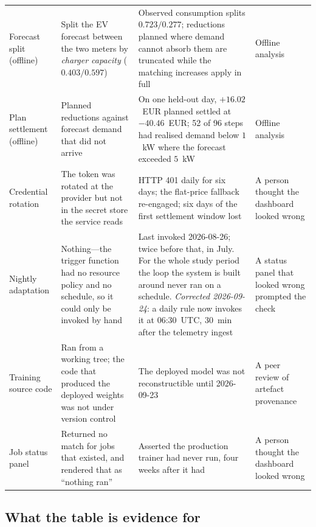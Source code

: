 \begin{table}[t]
\begin{tabular}{@{}p{}p{}p{}p{}@{}}
\addlinespace
Forecast split (offline) &
Split the EV forecast between the two meters by \emph{charger capacity}
($0.403/0.597$) &
Observed consumption splits $0.723/0.277$; reductions planned where demand
cannot absorb them are truncated while the matching increases apply in full &
Offline analysis \\

\addlinespace
Plan settlement (offline) &
Planned reductions against forecast demand that did not arrive &
On one held-out day, $+16.02$~EUR planned settled at $-40.46$~EUR; 52 of 96
steps had realised demand below $1$~kW where the forecast exceeded $5$~kW &
Offline analysis \\

\addlinespace
Credential rotation &
The token was rotated at the provider but not in the secret store the service
reads &
HTTP 401 daily for six days; the flat-price fallback re-engaged; six days of
the first settlement window lost &
A person thought the dashboard looked wrong \\

\addlinespace
Nightly adaptation &
Nothing---the trigger function had no resource policy and no schedule, so it
could only be invoked by hand &
Last invoked 2026-08-26; twice before that, in July. For the whole study
period the loop the system is built around never ran on a schedule.
\emph{Corrected 2026-09-24}: a daily rule now invokes it at 06:30~UTC,
30~min after the telemetry ingest &
A status panel that looked wrong prompted the check \\

\addlinespace
Training source code &
Ran from a working tree; the code that produced the deployed weights was not
under version control &
The deployed model was not reconstructible until 2026-09-23 &
A peer review of artefact provenance \\

\addlinespace
Job status panel &
Returned no match for jobs that existed, and rendered that as
``nothing ran'' &
Asserted the production trainer had never run, four weeks after it had &
A person thought the dashboard looked wrong \\

\bottomrule
\end{tabular}
\end{table}

\subsection{What the table is evidence for}

